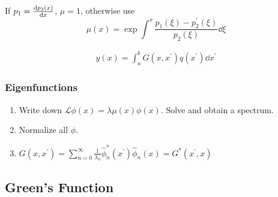 \documentclass[8pt]{extarticle}
\newcommand{\Lh}{ {\mathcal{L}} }
\begin{document}
\begin{multicols*}{3}
If $p_1 = \dv{p_2(x)}{x}$, $\mu = 1$, otherwise use
\begin{equation*}
    \mu(x) = \exp{\int^x \frac{p_1(\xi) - p_2^\prime(\xi)}{p_2(\xi)} \dd{\xi}}
\end{equation*}

\begin{gather*}
    y(x) = \int_a^b G(x, x^\prime) q(x^\prime) \dd{x^\prime}
\end{gather*}

\subsubsection{Eigenfunctions}
\begin{enumerate}
    \item Write down $\Lh \phi(x) = \lambda \mu(x) \phi(x)$. Solve and obtain
        a spectrum.
    \item Normalize all $\phi$.
    \item $G(x,x^\prime) = \sum_{n=0}^\infty \frac{1}{\lambda_n}
    \hat{\phi}^*_n(x^\prime) \hat{\phi}_n(x) = G^*(x^\prime, x)$
\end{enumerate}

\subsection{Green's Function}


\end{multicols*}
\end{document}
